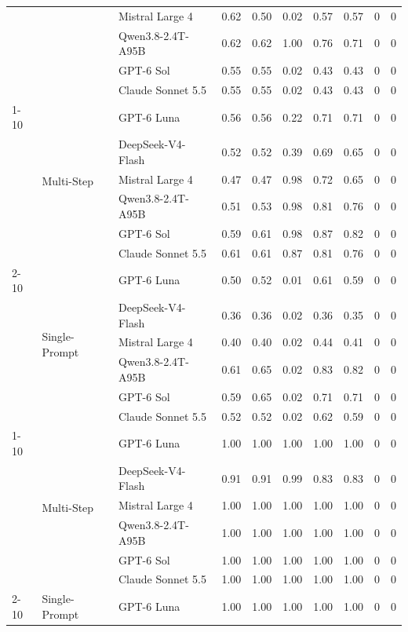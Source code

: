 \begin{tabular}{lllrrrrrrr}
 &  & Mistral Large 4 & 0.62 & 0.50 & 0.02 & 0.57 & 0.57 & 0 & 0 \\
 &  & Qwen3.8-2.4T-A95B & 0.62 & 0.62 & 1.00 & 0.76 & 0.71 & 0 & 0 \\
 &  & GPT-6 Sol & 0.55 & 0.55 & 0.02 & 0.43 & 0.43 & 0 & 0 \\
 &  & Claude Sonnet 5.5 & 0.55 & 0.55 & 0.02 & 0.43 & 0.43 & 0 & 0 \\
\cline{1-10} \cline{2-10}
\multirow[t]{12}{*}{sisu} & \multirow[t]{6}{*}{Multi-Step} & GPT-6 Luna & 0.56 & 0.56 & 0.22 & 0.71 & 0.71 & 0 & 0 \\
 &  & DeepSeek-V4-Flash & 0.52 & 0.52 & 0.39 & 0.69 & 0.65 & 0 & 0 \\
 &  & Mistral Large 4 & 0.47 & 0.47 & 0.98 & 0.72 & 0.65 & 0 & 0 \\
 &  & Qwen3.8-2.4T-A95B & 0.51 & 0.53 & 0.98 & 0.81 & 0.76 & 0 & 0 \\
 &  & GPT-6 Sol & 0.59 & 0.61 & 0.98 & 0.87 & 0.82 & 0 & 0 \\
 &  & Claude Sonnet 5.5 & 0.61 & 0.61 & 0.87 & 0.81 & 0.76 & 0 & 0 \\
\cline{2-10}
 & \multirow[t]{6}{*}{Single-Prompt} & GPT-6 Luna & 0.50 & 0.52 & 0.01 & 0.61 & 0.59 & 0 & 0 \\
 &  & DeepSeek-V4-Flash & 0.36 & 0.36 & 0.02 & 0.36 & 0.35 & 0 & 0 \\
 &  & Mistral Large 4 & 0.40 & 0.40 & 0.02 & 0.44 & 0.41 & 0 & 0 \\
 &  & Qwen3.8-2.4T-A95B & 0.61 & 0.65 & 0.02 & 0.83 & 0.82 & 0 & 0 \\
 &  & GPT-6 Sol & 0.59 & 0.65 & 0.02 & 0.71 & 0.71 & 0 & 0 \\
 &  & Claude Sonnet 5.5 & 0.52 & 0.52 & 0.02 & 0.62 & 0.59 & 0 & 0 \\
\cline{1-10} \cline{2-10}
\multirow[t]{12}{*}{tax} & \multirow[t]{6}{*}{Multi-Step} & GPT-6 Luna & 1.00 & 1.00 & 1.00 & 1.00 & 1.00 & 0 & 0 \\
 &  & DeepSeek-V4-Flash & 0.91 & 0.91 & 0.99 & 0.83 & 0.83 & 0 & 0 \\
 &  & Mistral Large 4 & 1.00 & 1.00 & 1.00 & 1.00 & 1.00 & 0 & 0 \\
 &  & Qwen3.8-2.4T-A95B & 1.00 & 1.00 & 1.00 & 1.00 & 1.00 & 0 & 0 \\
 &  & GPT-6 Sol & 1.00 & 1.00 & 1.00 & 1.00 & 1.00 & 0 & 0 \\
 &  & Claude Sonnet 5.5 & 1.00 & 1.00 & 1.00 & 1.00 & 1.00 & 0 & 0 \\
\cline{2-10}
 & \multirow[t]{6}{*}{Single-Prompt} & GPT-6 Luna & 1.00 & 1.00 & 1.00 & 1.00 & 1.00 & 0 & 0 \\

\end{tabular}
